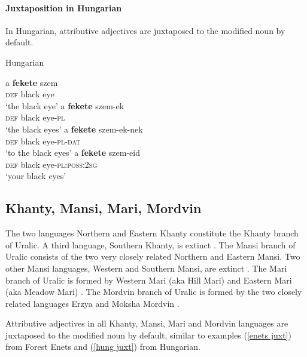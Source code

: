 \paragraph{Juxtaposition in Hungarian}
In Hungarian, attributive adjectives are juxtaposed to the modified noun by default.
\begin{exe}
\label{hung juxt}
\ex \rm{Hungarian \citep[41]{hall1938}}
\begin{xlist}
\ex 
\gll	a \textbf{fekete} szem\\
	\textsc{def} black eye\\
\glt	‘the black eye’
\ex	
\gll	a \textbf{fekete} szem-ek\\
	\textsc{def} black eye-\textsc{pl}\\
\glt	‘the black eyes’
\ex
\gll	a \textbf{fekete} szem-ek-nek\\
	\textsc{def} black eye-\textsc{pl}-\textsc{dat}\\
\glt	‘to the black eyes’
\ex
\gll	a \textbf{fekete} szem-eid\\
	\textsc{def} black eye-\textsc{pl:poss:2sg}\\
\glt	‘your black eyes’
\end{xlist}
\end{exe}

\subsection{Khanty, Mansi, Mari, Mordvin}
The two languages Northern and Eastern Khanty constitute the Khanty branch of Uralic. A third language, Southern Khanty, is extinct \citep[231]{salminen2007}. The Mansi branch of Uralic consists of the two very closely related Northern and Eastern Mansi. Two other Mansi languages, Western and Southern Mansi, are extinct \citep[231]{salminen2007}. The Mari branch of Uralic is formed by Western Mari (aka Hill Mari) and Eastern Mari (aka Meadow Mari) \citep[231]{salminen2007}. The Mordvin branch of Uralic is formed by the two closely related languages Erzya and Moksha Mordvin \citep[231]{salminen2007}.

Attributive adjectives in all Khanty, Mansi, Mari and Mordvin languages are juxtaposed to the modified noun by default, similar to examples (\ref{enets juxt}) from Forest Enets and (\ref{hung juxt}) from Hungarian.

